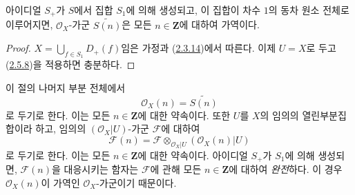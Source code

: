 \begin{corollary}[2.5.9]
\label{II.2.5.9-ko}
아이디얼 $S_+$가 $S$에서 집합 $S_1$에 의해 생성되고, 이 집합이 차수
$1$의 동차 원소 전체로 이루어지면, $\mathcal{O}_X$-가군
$\widetilde{S(n)}$은 모든 $n\in\mathbf{Z}$에 대하여 가역이다.
\end{corollary}

\begin{proof}
$X=\bigcup_{f\in S_1}D_+(f)$임은 가정과
(\hyperref[II.2.3.14-ko]{2.3.14})에서 따른다. 이제 $U=X$로 두고
(\hyperref[II.2.5.8-ko]{2.5.8})을 적용하면 충분하다.
\end{proof}

\begin{env}[2.5.10]
\label{II.2.5.10-ko}
이 절의 나머지 부분 전체에서
\[
\label{II.2.5.10.1-ko}
  \mathcal{O}_X(n)=\widetilde{S(n)}
\tag{2.5.10.1}
\]
로 두기로 한다. 이는 모든 $n\in\mathbf{Z}$에 대한 약속이다. 또한
$U$를 $X$의 임의의 열린부분집합이라 하고, 임의의
$(\mathcal{O}_X|U)$-가군 $\mathcal{F}$에 대하여
\[
\label{II.2.5.10.2-ko}
  \mathcal{F}(n)=
  \mathcal{F}\otimes_{\mathcal{O}_X|U}(\mathcal{O}_X(n)|U)
\tag{2.5.10.2}
\]
로 두기로 한다. 이는 모든 $n\in\mathbf{Z}$에 대한 약속이다. 아이디얼
$S_+$가 $S_1$에 의해 생성되면, $\mathcal{F}(n)$을 대응시키는 함자는
$\mathcal{F}$에 관해 모든 $n\in\mathbf{Z}$에 대하여 \emph{완전}하다. 이 경우
$\mathcal{O}_X(n)$이 가역인 $\mathcal{O}_X$-가군이기 때문이다.
\end{env}

